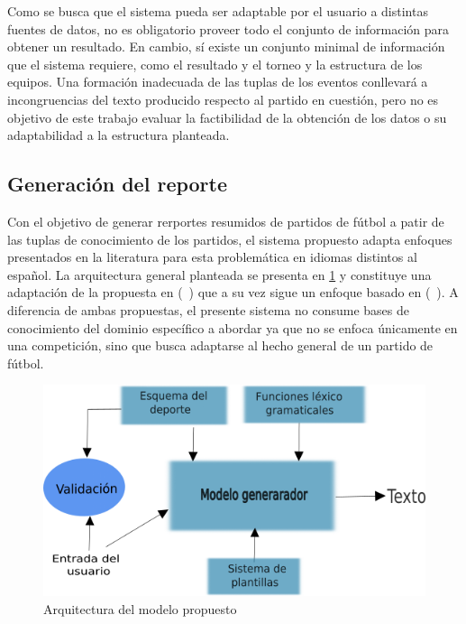     Como se busca que el sistema pueda ser adaptable por el usuario a distintas fuentes de datos, no es obligatorio proveer todo el conjunto de información para 
obtener un resultado. En cambio, sí existe un conjunto minimal de información que el sistema requiere, como el resultado y el torneo y la estructura de los equipos. 
Una formación inadecuada de las tuplas de los eventos conllevará a incongruencias del texto producido respecto al partido en cuestión, pero no es objetivo de 
este trabajo evaluar la factibilidad de la obtención de los datos o su adaptabilidad a la estructura planteada.


\subsection{Generación del reporte}

    Con el objetivo de generar rerportes resumidos de partidos de fútbol a patir de las tuplas de conocimiento de los partidos, el sistema propuesto adapta enfoques presentados 
en la literatura para esta problemática en idiomas distintos al español. La arquitectura general planteada se presenta en \ref{arquitecturadelmodelo} y constituye una 
adaptación de la propuesta en (~\cite{aires2016automatic}) que a su vez sigue un enfoque basado en (~\cite{theune2001data}). A diferencia de ambas propuestas, el 
presente sistema no consume bases de conocimiento del dominio específico a abordar ya que no se enfoca únicamente en una competición, sino que busca adaptarse al hecho 
general de un partido de fútbol. 


\begin{figure}[!]
    \begin{center}
        \includegraphics[scale=0.9]{Graphics/arquitecturaprop2.png}
    \end{center}
    \caption{Arquitectura del modelo propuesto}
    \label{arquitecturadelmodelo}
\end{figure}


